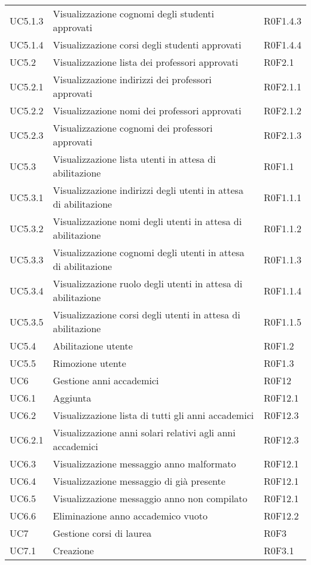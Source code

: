 \documentclass[AnalisiDeiRequisiti.tex]{subfiles}
\begin{document}
\begin{longtable}[H]{p{2cm}p{5cm}p{5cm}}
	UC5.1.3 & Visualizzazione cognomi degli studenti approvati & R0F1.4.3 \\
	UC5.1.4 & Visualizzazione corsi degli studenti approvati & R0F1.4.4 \\
	UC5.2 & Visualizzazione lista dei professori approvati & R0F2.1 \\
	UC5.2.1 & Visualizzazione indirizzi dei professori approvati & R0F2.1.1 \\
	UC5.2.2 & Visualizzazione nomi dei professori approvati & R0F2.1.2 \\
	UC5.2.3 & Visualizzazione cognomi dei professori approvati & R0F2.1.3 \\
	UC5.3 & Visualizzazione lista utenti in attesa di abilitazione & R0F1.1 \\
	UC5.3.1 & Visualizzazione indirizzi degli utenti in attesa di abilitazione & R0F1.1.1 \\
	UC5.3.2 & Visualizzazione nomi degli utenti in attesa di abilitazione & R0F1.1.2 \\
	UC5.3.3 & Visualizzazione cognomi degli utenti in attesa di abilitazione & R0F1.1.3 \\
	UC5.3.4 & Visualizzazione ruolo degli utenti in attesa di abilitazione &R0F1.1.4  \\
	UC5.3.5 & Visualizzazione corsi degli utenti in attesa di abilitazione & R0F1.1.5 \\
	UC5.4 & Abilitazione utente & R0F1.2 \\
	UC5.5 & Rimozione utente & R0F1.3 \\
	UC6 & Gestione anni accademici & R0F12 \\
	UC6.1 & Aggiunta \citGloss{anno accademico} & R0F12.1 \\
	UC6.2 & Visualizzazione lista di tutti gli anni accademici & R0F12.3 \\
	UC6.2.1 & Visualizzazione anni solari relativi agli anni accademici & R0F12.3 \\
	UC6.3 & Visualizzazione messaggio anno malformato & R0F12.1 \\
	UC6.4 & Visualizzazione messaggio di \citGloss{anno accademico} già presente & R0F12.1 \\
	UC6.5 & Visualizzazione messaggio anno non compilato & R0F12.1 \\
	UC6.6 & Eliminazione anno accademico vuoto & R0F12.2 \\
	UC7 & Gestione corsi di laurea & R0F3 \\
	UC7.1 & Creazione \citGloss{corso di laurea} & \makecell[tl]{
		R0F3.1\\
}
\end{longtable}
\end{document}
